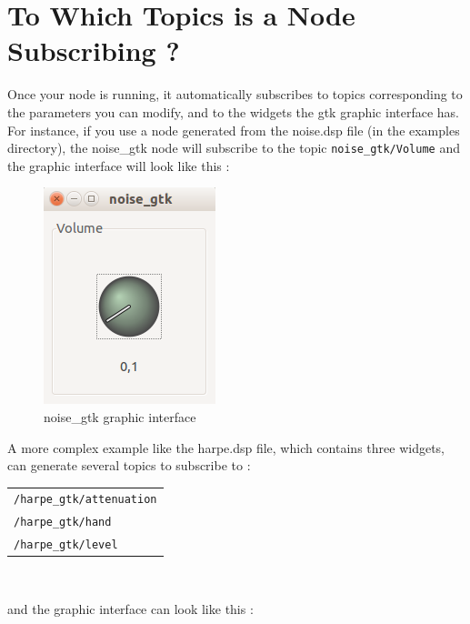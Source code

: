 \section{To Which Topics is a \faust Node Subscribing ?}
Once your \faust node is running, it automatically subscribes to topics corresponding to the parameters you can modify, and to the widgets the gtk graphic interface has. For instance, if you use a \faust node generated from the noise.dsp file (in the examples directory), the noise\_gtk node will subscribe to the topic \lstinline'noise_gtk/Volume' and the graphic interface will look like this :
\begin{figure}[ht!]
\centering
\begin{adjustbox}{minipage=5cm,margin=0pt 10pt,bgcolor=gray}
\centering
\includegraphics[scale=0.5]{images/noise_gtk.png}
\end{adjustbox}
\caption{noise\_gtk graphic interface}
\label{fig:noise_gtk}

\end{figure}
\newpage
A more complex example like the harpe.dsp file, which contains three widgets, can generate several topics to subscribe to :
\\
\begin{center}

\begin{tabular}{l}
	\lstinline'/harpe_gtk/attenuation' \\
	\lstinline'/harpe_gtk/hand' \\
	\lstinline'/harpe_gtk/level' \\
\end{tabular}\\
\end{center}
and the graphic interface can look like this :
